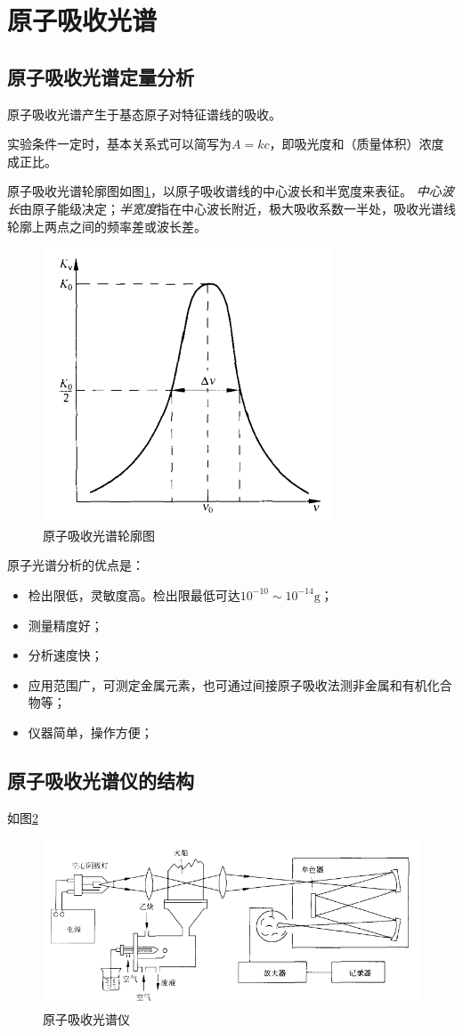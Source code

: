 \section{原子吸收光谱}

\subsection{原子吸收光谱定量分析}
原子吸收光谱产生于基态原子对特征谱线的吸收。

实验条件一定时，基本关系式可以简写为$A=kc$，即吸光度和（质量体积）浓度成正比。

原子吸收光谱轮廓图如图\ref{fig:chp8absorption}，以原子吸收谱线的中心波长和半宽度来表征。
\textit{中心波长}由原子能级决定；\textit{半宽度}指在中心波长附近，极大吸收系数一半处，吸收光谱线轮廓上两点之间的频率差或波长差。

\begin{figure}[!h]
	\centering
	\includegraphics[width=0.4\linewidth]{image/chp8_absorption}
	\caption{原子吸收光谱轮廓图}
	\label{fig:chp8absorption}
\end{figure}

原子光谱分析的优点是：
\begin{itemize}
	\item 检出限低，灵敏度高。检出限最低可达$10^{-10}\sim 10^{-14}\mathrm{g}$；
	\item 测量精度好；
	\item 分析速度快；
	\item 应用范围广，可测定金属元素，也可通过间接原子吸收法测非金属和有机化合物等；
	\item 仪器简单，操作方便；
\end{itemize}

\subsection{原子吸收光谱仪的结构}

如图\ref{fig:chp8instrument}
\begin{figure}[!h]
	\centering
	\includegraphics[width=0.7\linewidth]{image/chp8_instrument}
	\caption{原子吸收光谱仪}
	\label{fig:chp8instrument}
\end{figure}

